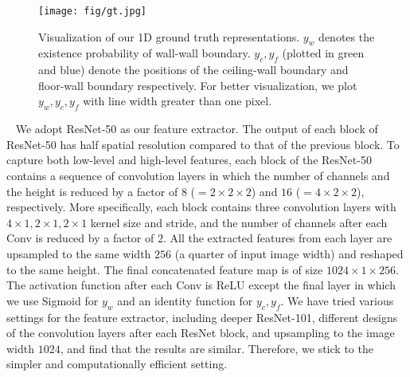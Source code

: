 \documentclass[10pt,twocolumn,letterpaper]{article}
\makeatletter
\renewcommand{\paragraph}{\@startsection{paragraph}{4}{\z@}{0\baselineskip \@plus 0ex \@minus 0ex}{-0em}{\normalfont\normalsize\bfseries}}
\makeatother
\begin{document}
\begin{figure}[h]
   \centering
   \setlength\tabcolsep{1pt}
\texttt{[image: fig/gt.jpg]}
    \caption{Visualization of our 1D ground truth representations. $y_w$ denotes the existence probability of wall-wall boundary. $y_c, y_f$ (plotted in green and blue) denote the positions of the ceiling-wall boundary and floor-wall boundary respectively. For better visualization, we plot $y_w, y_c, y_f$ with line width greater than one pixel.}
    \label{fig:gt}
\end{figure}

\paragraph{Feature Extractor:} ~ We adopt ResNet-50 \cite{HeZRS16} as our feature extractor. The output of each block of ResNet-50 has half spatial resolution compared to that of the previous block. To capture both low-level and high-level features, each block of the ResNet-50 contains a sequence of convolution layers in which the number of channels and the height is reduced by a factor of $8$ ($=2\times 2\times 2$) and $16$ ($=4\times2\times2$), respectively. More specifically, each block contains three convolution layers with $4 \times 1, 2 \times 1, 2 \times 1$ kernel size and stride, and the number of channels after each Conv is reduced by a factor of $2$. All the extracted features from each layer are upsampled to the same width $256$ (a quarter of input image width) and reshaped to the same height. The final concatenated feature map is of size  $1024 \times 1 \times  256$. The activation function after each Conv is ReLU except the final layer in which we use Sigmoid for $y_w$ and an identity function for $y_c, y_f$. We have tried various settings for the feature extractor, including deeper ResNet-101, different designs of the convolution layers after each ResNet block, and upsampling to the image width $1024$, and find that the results are similar. Therefore, we stick to the simpler and computationally efficient setting.
\end{document}
